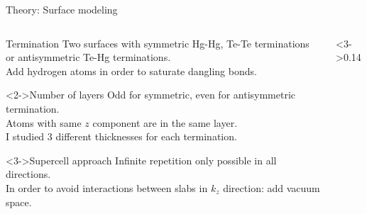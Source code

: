 \begin{frame}{Theory: Surface modeling}
	\begin{columns}
		\begin{column}{.86\linewidth}
			\begin{block}{Termination}
				Two surfaces with symmetric Hg-Hg, Te-Te terminations or antisymmetric Te-Hg terminations.\\
				Add hydrogen atoms in order to saturate dangling bonds. 
			\end{block}
			\begin{block}<2->{Number of layers}
				Odd for symmetric, even for antisymmetric termination.\\
				Atoms with same $z$ component are in the same layer.\\
				I studied 3 different thicknesses for each termination.				
			\end{block}
			\begin{block}<3->{Supercell approach}
				Infinite repetition only possible in all directions.\\
				In order to avoid interactions between slabs in $k_z$ direction: add vacuum space. 
			\end{block}
		\end{column}
		\begin{column}<3->{0.14\linewidth} 
			\centering

\end{column}
\end{columns}
\end{frame}
